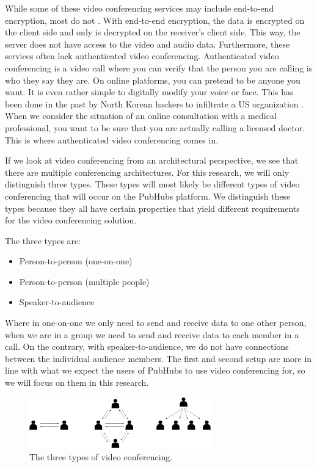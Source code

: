 \documentclass{report}
\begin{document}
While some of these video conferencing services may include end-to-end encryption, most do not \cite{gauthier_dynamic_2021}.
With end-to-end encryption, the data is encrypted on the client side and only is decrypted on the receiver's client
side. This way, the server does not have access to the video and audio data. Furthermore,
these services often lack authenticated video conferencing. Authenticated video conferencing is a video
call where you can verify that the person you are calling is who they say they are.
On online platforms, you can pretend to be anyone you want. It is even rather simple to digitally
modify your voice or face. This has been done in the past by North Korean hackers to infiltrate a US organization \cite{
noauthor_how_nodate}. When we consider the situation of an online consultation with a medical professional,
you want to be sure that you are actually calling a licensed doctor. This is where authenticated video conferencing comes in.

If we look at video conferencing from an architectural perspective, we see that there are multiple conferencing
architectures. For this research, we will only distinguish three types. These types will most likely be different types
of video conferencing that will occur on the PubHubs platform. We distinguish these types because
they all have certain properties that yield different requirements for the video conferencing solution. 

\newpage
The three types are:
\begin{itemize}
\item Person-to-person (one-on-one)
\item Person-to-person (multiple people)
\item Speaker-to-audience
\end{itemize}

Where in one-on-one we only need to send and receive data to one other person, when we are in a
group we need to send and receive data to each member in a call. On the contrary, with speaker-to-audience, we do
not have connections between the individual audience members. The first and second setup are more in line with what
we expect the users of PubHubs to use video conferencing for, so we will focus on them in this research.

\begin{figure}[!hbt]
\centering
\includegraphics[width=0.7\textwidth]{img/three-types}
\caption{The three types of video conferencing.}
\label{fig:three-types-video-conferencing}
\end{figure}
\end{document}
